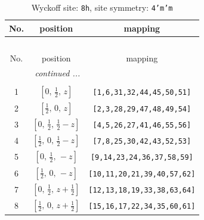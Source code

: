 \documentclass[fleqn,8pt]{jsarticle}
\begin{document}
\begin{longtable}{ccc}
\caption{Wyckoff site: {\tt 8h}, site symmetry: {\tt 4'm'm}}
 \\
 \hline \hline
No. & position & mapping \\ \hline \endfirsthead

\multicolumn{2}{l}{\tablename\ \thetable{}} \\
 \hline \hline
No. & position & mapping \\ \hline \endhead

 \hline \hline
\multicolumn{2}{r}{\footnotesize\it continued ...} \\ \endfoot

 \hline \hline
\multicolumn{2}{r}{} \\ \endlastfoot

1 & $\left[ 0,\, \frac{1}{2},\, z \right]$ & {\tt [1,6,31,32,44,45,50,51]} \\ \hline
2 & $\left[ \frac{1}{2},\, 0,\, z \right]$ & {\tt [2,3,28,29,47,48,49,54]} \\ \hline
3 & $\left[ 0,\, \frac{1}{2},\, \frac{1}{2} - z \right]$ & {\tt [4,5,26,27,41,46,55,56]} \\ \hline
4 & $\left[ \frac{1}{2},\, 0,\, \frac{1}{2} - z \right]$ & {\tt [7,8,25,30,42,43,52,53]} \\ \hline
5 & $\left[ 0,\, \frac{1}{2},\, - z \right]$ & {\tt [9,14,23,24,36,37,58,59]} \\ \hline
6 & $\left[ \frac{1}{2},\, 0,\, - z \right]$ & {\tt [10,11,20,21,39,40,57,62]} \\ \hline
7 & $\left[ 0,\, \frac{1}{2},\, z + \frac{1}{2} \right]$ & {\tt [12,13,18,19,33,38,63,64]} \\ \hline
8 & $\left[ \frac{1}{2},\, 0,\, z + \frac{1}{2} \right]$ & {\tt [15,16,17,22,34,35,60,61]} \\
\end{longtable}
\renewcommand{\arraystretch}{1.2}
\end{document}
